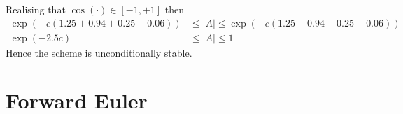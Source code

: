 \documentclass{article}
\begin{document}
Realising that $\cos(\cdot) \in [-1, +1]$ then
\begin{align}
\exp \left( -c \left( 1.25 + 0.94 + 0.25 + 0.06 \right) \right) &\leq |A| \leq \exp \left( -c \left( 1.25 - 0.94 - 0.25 - 0.06 \right) \right) \\
\exp \left( -2.5c \right) &\leq |A| \leq 1
\end{align}
Hence the scheme is unconditionally stable.


\section*{Forward Euler}
\end{document}
